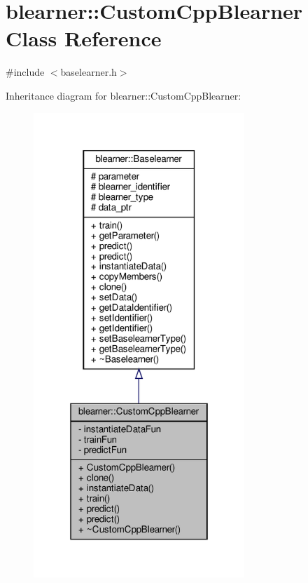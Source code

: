 \hypertarget{classblearner_1_1_custom_cpp_blearner}{}\section{blearner\+:\+:Custom\+Cpp\+Blearner Class Reference}
\label{classblearner_1_1_custom_cpp_blearner}


{\ttfamily \#include $<$baselearner.\+h$>$}



Inheritance diagram for blearner\+:\+:Custom\+Cpp\+Blearner\+:\nopagebreak
\begin{figure}[H]
\begin{center}
\leavevmode
\includegraphics[width=226pt]{classblearner_1_1_custom_cpp_blearner__inherit__graph}
\end{center}
\end{figure}



